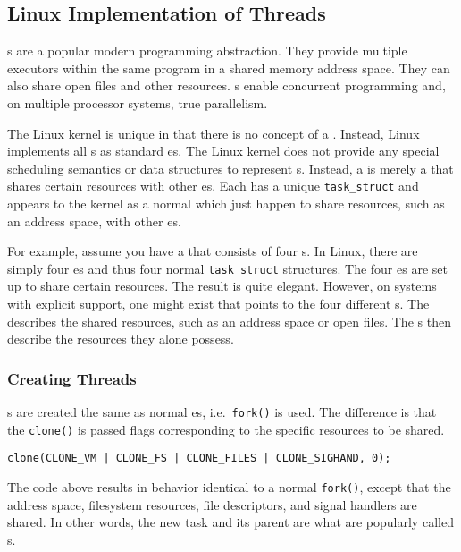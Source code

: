 \subsection{Linux Implementation of Threads}\label{subsec:Linux_Implementation_Threads}
s are a popular modern programming abstraction.
They provide multiple executors within the same program in a shared memory address space.
They can also share open files and other resources.
s enable concurrent programming and, on multiple processor systems, true parallelism.

The Linux kernel is unique in that there is no concept of a .
Instead, Linux implements all s as standard es.
The Linux kernel does not provide any special scheduling semantics or data structures to represent s.
Instead, a  is merely a  that shares certain resources with other es.
Each  has a unique \texttt{task_struct} and appears to the kernel as a normal  which just happen to share resources, such as an address space, with other es.

For example, assume you have a  that consists of four s.
In Linux, there are simply four es and thus four normal \texttt{task_struct} structures.
The four es are set up to share certain resources.
The result is quite elegant.
However, on systems with explicit  support, one  might exist that points to the four different s.
The  describes the shared resources, such as an address space or open files.
The s then describe the resources they alone possess.

\subsubsection{Creating Threads}\label{subsubsec:Creating_Threads}
s are created the same as normal es, i.e.\ \texttt{fork()} is used.
The difference is that the \texttt{clone()}  is passed flags corresponding to the specific resources to be shared.
\begin{verbatim}
clone(CLONE_VM | CLONE_FS | CLONE_FILES | CLONE_SIGHAND, 0);
\end{verbatim}

The code above results in behavior identical to a normal \texttt{fork()}, except that the address space, filesystem resources, file descriptors, and signal handlers are shared.
In other words, the new task and its parent are what are popularly called s.


